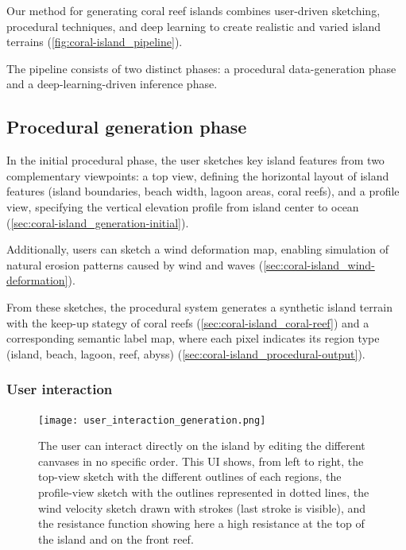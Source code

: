 Our method for generating coral reef islands combines user-driven sketching, procedural techniques, and deep learning to create realistic and varied island terrains (\cref{fig:coral-island_pipeline}). 

The pipeline consists of two distinct phases: a procedural data-generation phase and a deep-learning-driven inference phase. 

\subsection{Procedural generation phase}
\label{sec:coral-island_proc-phase}

In the initial procedural phase, the user sketches key island features from two complementary viewpoints: a top view, defining the horizontal layout of island features (island boundaries, beach width, lagoon areas, coral reefs), and a profile view, specifying the vertical elevation profile from island center to ocean (\cref{sec:coral-island_generation-initial}).

Additionally, users can sketch a wind deformation map, enabling simulation of natural erosion patterns caused by wind and waves (\cref{sec:coral-island_wind-deformation}).

From these sketches, the procedural system generates a synthetic island terrain with the keep-up stategy of coral reefs (\cref{sec:coral-island_coral-reef}) and a corresponding semantic label map, where each pixel indicates its region type (island, beach, lagoon, reef, abyss) (\cref{sec:coral-island_procedural-output}).




\subsubsection*{User interaction}
\label{sec:coral-island_description-UI}

\begin{figure}[H]
    \centering
    \texttt{[image: user\_interaction\_generation.png]}
    \caption{The user can interact directly on the island by editing the different canvases in no specific order. This UI shows, from left to right, the top-view sketch with the different outlines of each regions, the profile-view sketch with the outlines represented in dotted lines, the wind velocity sketch drawn with strokes (last stroke is visible), and the resistance function showing here a high resistance at the top of the island and on the front reef.}
    \label{fig:coral-island_wind-from-strokes-interaction}
\end{figure}

